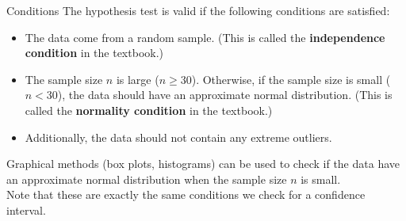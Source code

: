 \documentclass[fleqn, 10pt]{beamer}\usepackage[]{graphicx}\usepackage[]{color}
\begin{document}
\begin{frame}{Conditions}
The hypothesis test is valid if the following conditions are satisfied:
\vspace{5pt}
\begin{itemize}
\item The data come from a random sample.  (This is called the \textbf{independence condition} in the textbook.)
\vspace{5pt}
\item The sample size $n$ is large ($n \geq 30$).  Otherwise, if the sample size is small ($n < 30$), the data should have an approximate normal distribution. (This is called the \textbf{normality condition} in the textbook.)
\vspace{5pt}
\item Additionally, the data should not contain any extreme outliers.
\end{itemize}
\vspace{5pt}
Graphical methods (box plots, histograms) can be used to check if the data have an approximate normal distribution when the sample size $n$ is small.\\  
\vspace{5pt}
Note that these are exactly the same conditions we check for a confidence interval.
\end{frame}
\end{document}
